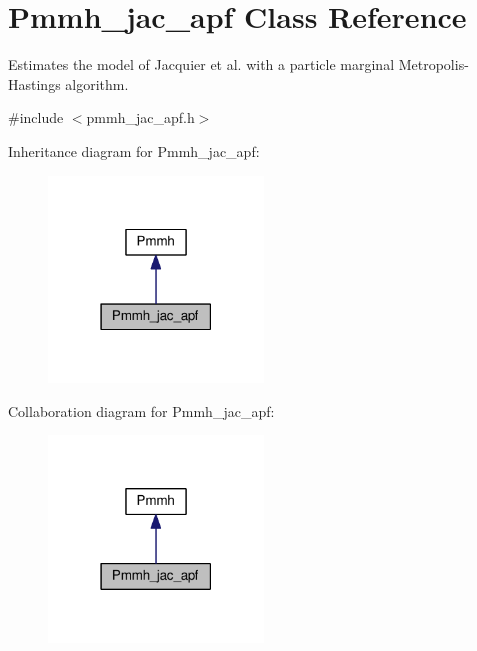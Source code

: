 \hypertarget{classPmmh__jac__apf}{}\section{Pmmh\+\_\+jac\+\_\+apf Class Reference}
\label{classPmmh__jac__apf}


Estimates the model of Jacquier et al. with a particle marginal Metropolis-\/\+Hastings algorithm.  




{\ttfamily \#include $<$pmmh\+\_\+jac\+\_\+apf.\+h$>$}



Inheritance diagram for Pmmh\+\_\+jac\+\_\+apf\+:\nopagebreak
\begin{figure}[H]
\begin{center}
\leavevmode
\includegraphics[width=162pt]{classPmmh__jac__apf__inherit__graph}
\end{center}
\end{figure}


Collaboration diagram for Pmmh\+\_\+jac\+\_\+apf\+:\nopagebreak
\begin{figure}[H]
\begin{center}
\leavevmode
\includegraphics[width=162pt]{classPmmh__jac__apf__coll__graph}
\end{center}
\end{figure}
